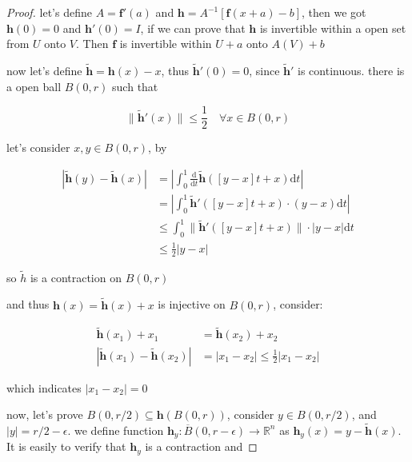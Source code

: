 \begin{proof}
    let's define $A = \mathbf{f}'(a)$ and $\mathbf{h} = A^{-1}\left[\mathbf{f}(x + a) - b\right]$, then we got $\mathbf{h}(0) = 0$
    and $\mathbf{h}'(0) = I$, if we can prove that $\mathbf{h}$ is invertible within
    a open set from $U$ onto $V$. Then $\mathbf{f}$ is invertible within $U + a$ onto $A(V) + b$

    now let's define $\tilde{\mathbf{h}} = \mathbf{h}(x) - x$, thus $\tilde{\mathbf{h}}'(0) = 0$, since $\tilde{\mathbf{h}}'$
    is continuous. there is a open ball $B(0,r)$ such that 

    \[
        \| \tilde{\mathbf{h}}'(x) \| \le \frac{1}{2} \quad \forall x \in B(0,r)
    \]

    let's consider $x,y \in B(0,r)$, by

    \begin{align*}
        \left|\tilde{\mathbf{h}}(y) - \tilde{\mathbf{h}}(x) \right| &= \left|\int_0^1 \frac{\mathrm{d}}{\mathrm{d}t} \tilde{\mathbf{h}}\left(\left[y-x\right]t + x\right)  \mathrm{d}t\right| \\
        &= \left|\int_0^1  \tilde{\mathbf{h}}'\left(\left[y-x\right]t + x\right) \cdot (y-x)  \mathrm{d}t\right| \\
        & \le \int_0^1  \|\tilde{\mathbf{h}}'\left(\left[y-x\right]t + x\right) \| \cdot \left| y-x \right|  \mathrm{d}t \\
        & \le \frac{1}{2} \left| y -x\right|
    \end{align*}

    so $\tilde{h}$ is a contraction on $B(0,r)$

    and thus $\mathbf{h}(x) = \tilde{\mathbf{h}}(x) + x$ is injective on $B(0,r)$, consider:

    \begin{align*}
        \tilde{\mathbf{h}}(x_1) + x_1 &= \tilde{\mathbf{h}}(x_2) + x_2 \\
\left|\tilde{\mathbf{h}}(x_1) - \tilde{\mathbf{h}}(x_2) \right| &= \left| x_1 - x_2\right| \le \frac{1}{2}\left| x_1 - x_2\right|
    \end{align*}

    which indicates $\left| x_1 -x_2\right| = 0$

    now, let's prove $B(0, r/2) \subseteq \mathbf{h}(B(0,r))$, consider $y \in B(0, r/2)$, and $|y| = r/2 - \epsilon$. we define
    function $\mathbf{h}_y: \overline{B}(0, r - \epsilon) \to \mathbb{R}^n$ as $\mathbf{h}_y(x) = y - \tilde{\mathbf{h}}(x) $. It is easily
    to verify that $\mathbf{h}_y$ is a contraction and
    

\end{proof}

